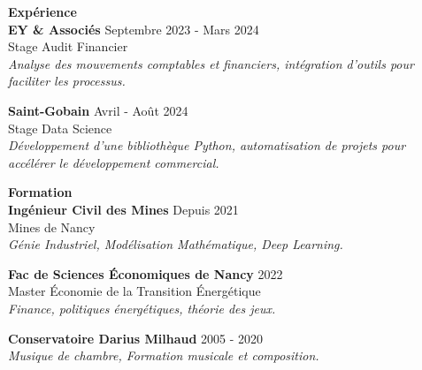 \documentclass[a4paper,10pt]{article}
\newcommand{\sectioncv}[2]{
    \vspace{0.5cm}
    \noindent \textbf{\textcolor{primary}{#1}} \\
    #2
}
\begin{document}
\begin{minipage}[t]{0.66\textwidth}
    \vspace{1cm}
    \sectioncv{Expérience}{}
    
    \textbf{EY \& Associés} \hfill Septembre 2023 - Mars 2024 \\
    Stage Audit Financier \\
    \textit{Analyse des mouvements comptables et financiers, intégration d'outils pour faciliter les processus.}
    
    \vspace{0.3cm}
    
    \textbf{Saint-Gobain} \hfill Avril - Août 2024 \\
    Stage Data Science \\
    \textit{Développement d'une bibliothèque Python, automatisation de projets pour accélérer le développement commercial.}
    
    \vspace{0.5cm}
    \sectioncv{Formation}{}
    
    \textbf{Ingénieur Civil des Mines} \hfill Depuis 2021 \\
    Mines de Nancy \\
    \textit{Génie Industriel, Modélisation Mathématique, Deep Learning.}
    
    \vspace{0.3cm}
    
    \textbf{Fac de Sciences Économiques de Nancy} \hfill 2022 \\
    Master Économie de la Transition Énergétique \\
    \textit{Finance, politiques énergétiques, théorie des jeux.}
    
    \vspace{0.3cm}
    
    \textbf{Conservatoire Darius Milhaud} \hfill 2005 - 2020 \\
    \textit{Musique de chambre, Formation musicale et composition.}
    
\end{minipage}
\end{document}
